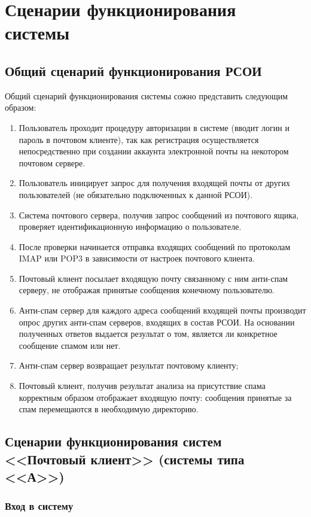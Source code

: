 \section{Сценарии функционирования системы}
\subsection{Общий сценарий функционирования РСОИ}
Общий сценарий функционирования системы сожно представить следующим образом:

\begin{enumerate}
  \item Пользователь проходит процедуру авторизации в системе (вводит логин и пароль в почтовом клиенте), так как регистрация осуществляется непосредственно при создании аккаунта электронной почты на некотором почтовом сервере.
  \item Пользователь иницирует запрос для получения входящей почты от других пользователей (не обязательно подключенных к данной РСОИ).
  \item Система почтового сервера, получив запрос сообщений из почтового ящика, проверяет идентификационную информацию о пользователе.
  \item После проверки начинается отправка входящих сообщений по протоколам IMAP или POP3 в зависимости от настроек почтового клиента.
  \item Почтовый клиент посылает входящую почту связанному с ним анти-спам серверу, не отображая принятые сообщения конечному пользователю.
  \item Анти-спам сервер для каждого адреса сообщений входящей почты производит опрос других анти-спам серверов, входящих в состав РСОИ. На основании полученных ответов выдается результат о том, является ли конкретное сообщение спамом или нет.
  \item Анти-спам сервер возвращает результат почтовому клиенту;
  \item Почтовый клиент, получив результат анализа на присутствие спама корректным образом отображает входящую почту: сообщения принятые за спам перемещаются в необходимую директорию.
\end{enumerate}

\subsection{Сценарии функционирования систем <<Почтовый клиент>> (системы типа <<А>>)}

\subsubsection*{Вход в систему}

